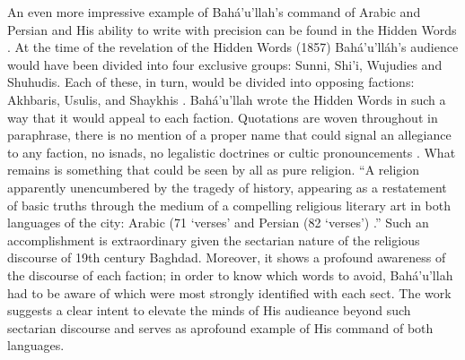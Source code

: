 \documentclass[12pt, oneside]{report}
\begin{document}
\par 
An even more impressive example of Bah\'{a}'u'llah's command of Arabic and Persian and His ability to write with precision can be found in the Hidden Words \cite{bahaullah_hidden_2002}. At the time of the revelation of the Hidden Words (1857) Bahá'u'lláh's audience would have been divided into four exclusive groups: Sunni, Shi'i, Wujudies and Shuhudis. Each of these, in turn, would be divided into opposing factions: Akhbaris, Usulis, and Shaykhis \cite{lawson_todd_globalization_2005}.  Bah\'{a}'u'llah wrote the Hidden Words in such a way that it would appeal to each faction. Quotations are woven throughout in paraphrase, there is no mention of a proper name that could signal an allegiance to any faction, no isnads, no legalistic doctrines or cultic pronouncements \cite{lawson_todd_globalization_2005}. What remains is something that could be seen by all as pure religion. ``A religion apparently unencumbered by the tragedy of history, appearing as a restatement of basic truths through the medium of a compelling religious literary art in both languages of the city: Arabic (71 `verses' and Persian (82 `verses') \cite{lawson_todd_globalization_2005}.'' Such an accomplishment is extraordinary given the sectarian nature of the religious discourse of 19th century Baghdad. Moreover, it shows a profound awareness of the discourse of each faction; in order to know which words to avoid, Bah\'{a}'u'llah had to be aware of which were most strongly identified with each sect. The work suggests a clear intent to elevate the minds of His audieance beyond such sectarian discourse and serves as aprofound example of His command of both languages.  
\end{document}
